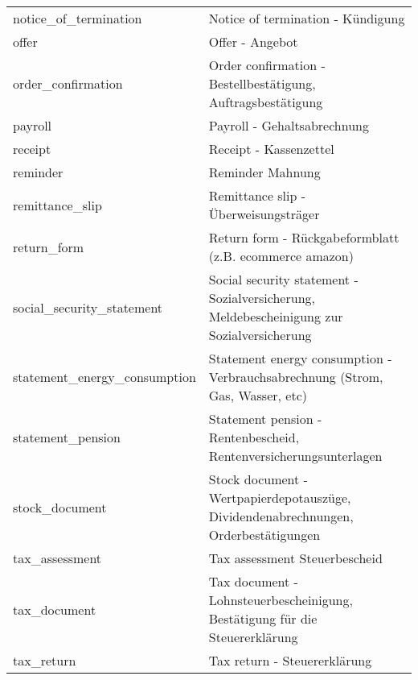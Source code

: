 \begin{longtable}[h]{|l|p{9cm}|}
 notice\_of\_termination                  &  Notice of termination -  K\"{u}ndigung                                                          \\
 offer                                    &  Offer -  Angebot                                                                                  \\
 order\_confirmation                      &  Order confirmation  - Bestellbest\"{a}tigung, Auftragsbest\"{a}tigung                         \\
 payroll                                  &  Payroll -  Gehaltsabrechnung                                                                      \\
 receipt                                  &  Receipt  - Kassenzettel                                                                           \\
 reminder                                 &  Reminder  Mahnung                                                                                 \\
 remittance\_slip                         &  Remittance slip -  \"{U}berweisungstr\"{a}ger                                                 \\
 return\_form                             &  Return form -  R\"{u}ckgabeformblatt (z.B. ecommerce amazon)                                    \\
 social\_security\_statement              &  Social security statement -  Sozialversicherung, Meldebescheinigung zur Sozialversicherung        \\
 statement\_energy\_consumption           &  Statement energy consumption -  Verbrauchsabrechnung (Strom, Gas, Wasser, etc)                    \\
 statement\_pension                       &  Statement pension -  Rentenbescheid, Rentenversicherungsunterlagen                                \\
 stock\_document                          &  Stock document -  Wertpapierdepotausz\"{u}ge, Dividendenabrechnungen, Orderbest\"{a}tigungen  \\
 tax\_assessment                          &  Tax assessment  Steuerbescheid                                                                    \\
 tax\_document                            &  Tax document -  Lohnsteuerbescheinigung, Best\"{a}tigung f\"{u}r die Steuererkl\"{a}rung    \\
 tax\_return                              &  Tax return -  Steuererkl\"{a}rung                                                               \\

\end{longtable}
